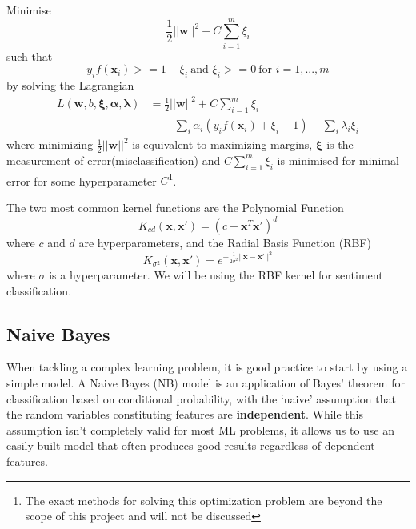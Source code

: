 \documentclass[12pt,a4paper,twoside,openright]{report}
\renewcommand{\vec}[1]{\mathbf{#1}}
\begin{document}
\noindent Minimise
\begin{equation}
\frac{1}{2}||\vec{w}||^2 + C \sum_{i=1}^m \xi_i
\end{equation}
such that
\begin{equation}
y_if(\vec{x}_i) >= 1-\xi_i\ \text{and\ } \xi_i >= 0\ \text{for\ } i = 1,...,m
\end{equation}
by solving the Lagrangian
\begin{equation}
\begin{split}
L(\vec{w}, b, \vec{\xi}, \vec{\alpha}, \vec{\lambda}) &= \frac{1}{2}||\vec{w}||^2 + C \sum_{i=1}^m \xi_i\\
&\quad - \sum_i\alpha_i(y_if(\vec{x}_i) + \xi_i - 1) - \sum_i\lambda_i\xi_i
\end{split}
\end{equation}
where minimizing $\frac{1}{2}||\vec{w}||^2$ is equivalent to maximizing margins, $\vec{\xi}$ is the measurement
of error(misclassification) and
$C \sum_{i=1}^m \xi_i$ is minimised for minimal error for some hyperparameter $C$\footnote{The exact methods for solving this
optimization problem are beyond the scope of this project and will not be discussed}.

The two most common kernel functions are the Polynomial Function
\begin{equation}
	K_{cd}(\vec{x},\vec{x}') = (c + \vec{x}^T\vec{x}')^d
\end{equation}
where $c$ and $d$ are hyperparameters, and the Radial Basis Function (RBF)
\begin{equation}
	K_{\sigma^2}(\vec{x},\vec{x}') = e^{-\frac{1}{2\sigma^2}||\vec{x}-\vec{x}'||^2}
\end{equation}
where $\sigma$ is a hyperparameter. We will be using the RBF kernel for sentiment classification.

\subsection{Naive Bayes}
\label{sec:introNB}

When tackling a complex learning problem, it is good practice to start by using
a simple model. A Naive Bayes (NB) model is an application of
Bayes' theorem for classification based on conditional probability, 
with the `naive' assumption that the random variables
constituting features are \textbf{independent}. While this assumption isn't completely valid for
most ML problems, it allows us to use an easily built model that often produces
good results regardless of dependent features.
\end{document}
